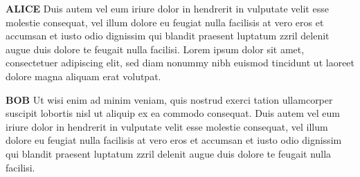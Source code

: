 \documentclass[11pt]{article}
\newcommand{\character}[1]{\textbf{\MakeUppercase{#1}}}
\begin{document}
\begin{flushleft}
\character{Alice} Duis autem vel eum iriure dolor in hendrerit in vulputate velit esse
molestie consequat, vel illum dolore eu feugiat nulla facilisis at
vero eros et accumsan et iusto odio dignissim qui blandit praesent
luptatum zzril delenit augue duis dolore te feugait nulla facilisi.
Lorem ipsum dolor sit amet, consectetuer adipiscing elit, sed diam
nonummy nibh euismod tincidunt ut laoreet dolore magna aliquam erat
volutpat. 

\character{Bob} Ut wisi enim ad minim veniam, quis nostrud exerci tation ullamcorper
suscipit lobortis nisl ut aliquip ex ea commodo consequat. Duis autem
vel eum iriure dolor in hendrerit in vulputate velit esse molestie
consequat, vel illum dolore eu feugiat nulla facilisis at vero eros
et accumsan et iusto odio dignissim qui blandit praesent luptatum
zzril delenit augue duis dolore te feugait nulla facilisi.

\end{flushleft}
\end{document}
